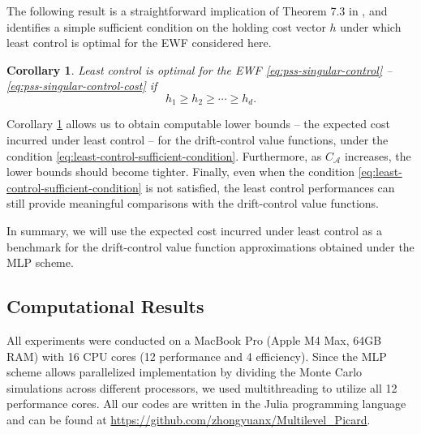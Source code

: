 \documentclass[11pt]{article}
\theoremstyle{definition}
\theoremstyle{plain}
\newtheorem{corollary}[assumption]{Corollary}
\begin{document}
The following result is a straightforward implication of Theorem 7.3 in \cite{PesicWilliams2016}, 
and identifies a simple sufficient condition on the holding cost vector $h$ 
under which least control is optimal for the EWF considered here. 
\begin{corollary}\label{cor:pss-singular-control-least-control}
Least control is optimal for the EWF \eqref{eq:pss-singular-control} -- \eqref{eq:pss-singular-control-cost} if 
\begin{equation}\label{eq:least-control-sufficient-condition}
h_1 \geq h_2 \geq \cdots \geq h_d.
\end{equation} 
\end{corollary}
Corollary \ref{cor:pss-singular-control-least-control} allows us to obtain computable lower bounds -- the expected cost incurred under least control -- for the drift-control value functions, 
under the condition \eqref{eq:least-control-sufficient-condition}. Furthermore, 
as $C_{\mathcal{A}}$ increases, the lower bounds should become tighter.
Finally, even when the condition \eqref{eq:least-control-sufficient-condition} is not satisfied, 
the least control performances can still provide meaningful comparisons with the drift-control value functions. 

In summary, we will use the expected cost incurred under least control as a benchmark 
for the drift-control value function approximations obtained under the MLP scheme. 

\subsection{Computational Results}\label{ssec:computational-results}

All experiments were conducted on a MacBook Pro (Apple M4 Max, 64GB RAM) with 16 CPU cores (12 performance and 4 efficiency). 
Since the MLP scheme allows parallelized implementation by dividing the Monte Carlo simulations across different processors, 
we used multithreading to utilize all 12 performance cores. All our codes are written in the Julia programming language 
and can be found at \url{https://github.com/zhongyuanx/Multilevel_Picard}.
\end{document}
